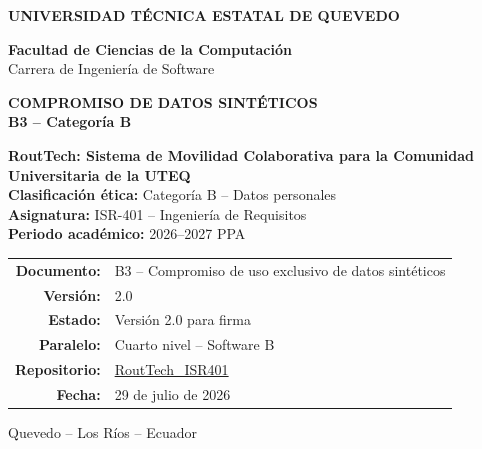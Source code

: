 \documentclass[10pt,a4paper]{article}
\newcommand{\Proyecto}{RoutTech: Sistema de Movilidad Colaborativa para la Comunidad Universitaria de la UTEQ}
\newcommand{\Asignatura}{ISR-401 -- Ingeniería de Requisitos}
\newcommand{\Periodo}{2026--2027 PPA}
\newcommand{\CategoriaEtica}{Categoría B -- Datos personales}
\newcommand{\Repositorio}{https://github.com/AnderJM3/RoutTech_ISR401}
\newcommand{\FechaDocumento}{29 de julio de 2026}
\newcommand{\VersionDocumento}{2.0}
\newcommand{\Paralelo}{Cuarto nivel -- Software B}
\newcommand{\EstadoDocumento}{Versión 2.0 para firma}
\begin{document}
\justifying

\thispagestyle{empty}

\vspace*{0.65cm}
\begin{center}
{\color{white}\Large\bfseries UNIVERSIDAD TÉCNICA ESTATAL DE QUEVEDO}

\vspace{1.75cm}
{\large\bfseries\color{RTForest} Facultad de Ciencias de la Computación\\[4pt]}
{\normalsize\color{RTGray} Carrera de Ingeniería de Software}

\vspace{0.8cm}

{\Huge\bfseries\color{RTForest} COMPROMISO DE DATOS SINTÉTICOS\\[8pt]}
{\Large\bfseries\color{RTTerracotta} B3 -- Categoría B}

\vspace{1.0cm}

\begin{tcolorbox}[width=0.90\textwidth,colback=RTCream,colframe=RTGold,boxrule=1pt,arc=2mm]
\centering
{\large\bfseries \Proyecto}\\[7pt]
\textbf{Clasificación ética:} \CategoriaEtica\\
\textbf{Asignatura:} \Asignatura\\
\textbf{Periodo académico:} \Periodo
\end{tcolorbox}

\vfill
\begin{tabular}{rl}
\textbf{Documento:} & B3 -- Compromiso de uso exclusivo de datos sintéticos\\
\textbf{Versión:} & \VersionDocumento\\
\textbf{Estado:} & \EstadoDocumento\\
\textbf{Paralelo:} & \Paralelo\\
\textbf{Repositorio:} & \href{\Repositorio}{RoutTech\_ISR401}\\
\textbf{Fecha:} & \FechaDocumento
\end{tabular}

\vspace{0.75cm}
{\small Quevedo -- Los Ríos -- Ecuador}
\end{center}
\clearpage
\end{document}
